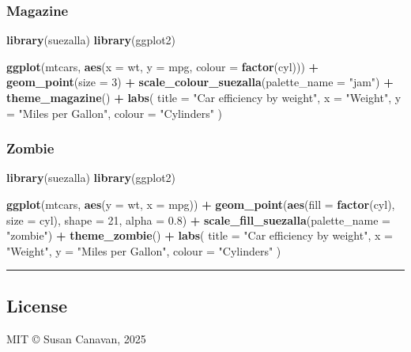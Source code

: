 \documentclass[
]{article}
\newenvironment{Shaded}{\begin{snugshade}}{\end{snugshade}}
\newcommand{\AttributeTok}[1]{\textcolor[rgb]{0.13,0.29,0.53}{#1}}
\newcommand{\DecValTok}[1]{\textcolor[rgb]{0.00,0.00,0.81}{#1}}
\newcommand{\FloatTok}[1]{\textcolor[rgb]{0.00,0.00,0.81}{#1}}
\newcommand{\FunctionTok}[1]{\textcolor[rgb]{0.13,0.29,0.53}{\textbf{#1}}}
\newcommand{\NormalTok}[1]{#1}
\newcommand{\SpecialCharTok}[1]{\textcolor[rgb]{0.81,0.36,0.00}{\textbf{#1}}}
\newcommand{\StringTok}[1]{\textcolor[rgb]{0.31,0.60,0.02}{#1}}
\begin{document}
\subsubsection{Magazine}\label{magazine}

\begin{Shaded}
\begin{Highlighting}[]
\FunctionTok{library}\NormalTok{(suezalla)}
\FunctionTok{library}\NormalTok{(ggplot2)}

\FunctionTok{ggplot}\NormalTok{(mtcars, }\FunctionTok{aes}\NormalTok{(}\AttributeTok{x =}\NormalTok{ wt, }\AttributeTok{y =}\NormalTok{ mpg, }\AttributeTok{colour =} \FunctionTok{factor}\NormalTok{(cyl))) }\SpecialCharTok{+}
  \FunctionTok{geom\_point}\NormalTok{(}\AttributeTok{size =} \DecValTok{3}\NormalTok{) }\SpecialCharTok{+}
  \FunctionTok{scale\_colour\_suezalla}\NormalTok{(}\AttributeTok{palette\_name =} \StringTok{"jam"}\NormalTok{) }\SpecialCharTok{+}
  \FunctionTok{theme\_magazine}\NormalTok{() }\SpecialCharTok{+}
  \FunctionTok{labs}\NormalTok{(}
    \AttributeTok{title =} \StringTok{"Car efficiency by weight"}\NormalTok{,}
    \AttributeTok{x =} \StringTok{"Weight"}\NormalTok{,}
    \AttributeTok{y =} \StringTok{"Miles per Gallon"}\NormalTok{,}
    \AttributeTok{colour =} \StringTok{"Cylinders"}
\NormalTok{  )}
\end{Highlighting}
\end{Shaded}

\subsubsection{Zombie}\label{zombie}

\begin{Shaded}
\begin{Highlighting}[]
\FunctionTok{library}\NormalTok{(suezalla)}
\FunctionTok{library}\NormalTok{(ggplot2)}

\FunctionTok{ggplot}\NormalTok{(mtcars, }\FunctionTok{aes}\NormalTok{(}\AttributeTok{y =}\NormalTok{ wt, }\AttributeTok{x =}\NormalTok{ mpg)) }\SpecialCharTok{+} 
  \FunctionTok{geom\_point}\NormalTok{(}\FunctionTok{aes}\NormalTok{(}\AttributeTok{fill =} \FunctionTok{factor}\NormalTok{(cyl), }\AttributeTok{size =}\NormalTok{ cyl), }\AttributeTok{shape =} \DecValTok{21}\NormalTok{, }\AttributeTok{alpha =} \FloatTok{0.8}\NormalTok{) }\SpecialCharTok{+} 
  \FunctionTok{scale\_fill\_suezalla}\NormalTok{(}\AttributeTok{palette\_name =} \StringTok{"zombie"}\NormalTok{) }\SpecialCharTok{+} 
  \FunctionTok{theme\_zombie}\NormalTok{() }\SpecialCharTok{+}
  \FunctionTok{labs}\NormalTok{(}
    \AttributeTok{title =} \StringTok{"Car efficiency by weight"}\NormalTok{,}
    \AttributeTok{x =} \StringTok{"Weight"}\NormalTok{,}
    \AttributeTok{y =} \StringTok{"Miles per Gallon"}\NormalTok{,}
    \AttributeTok{colour =} \StringTok{"Cylinders"}
\NormalTok{  )}
\end{Highlighting}
\end{Shaded}

\begin{center}\rule{0.5\linewidth}{0.5pt}\end{center}

\subsection{License}\label{license}

MIT © Susan Canavan, 2025
\end{document}
